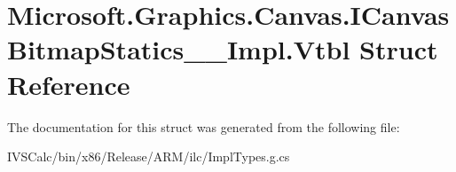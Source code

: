 \hypertarget{struct_microsoft_1_1_graphics_1_1_canvas_1_1_i_canvas_bitmap_statics_____impl_1_1_vtbl}{}\section{Microsoft.\+Graphics.\+Canvas.\+I\+Canvas\+Bitmap\+Statics\+\_\+\+\_\+\+Impl.\+Vtbl Struct Reference}
\label{struct_microsoft_1_1_graphics_1_1_canvas_1_1_i_canvas_bitmap_statics_____impl_1_1_vtbl}


The documentation for this struct was generated from the following file\+:\begin{DoxyCompactItemize}
\item 
I\+V\+S\+Calc/bin/x86/\+Release/\+A\+R\+M/ilc/Impl\+Types.\+g.\+cs\end{DoxyCompactItemize}
